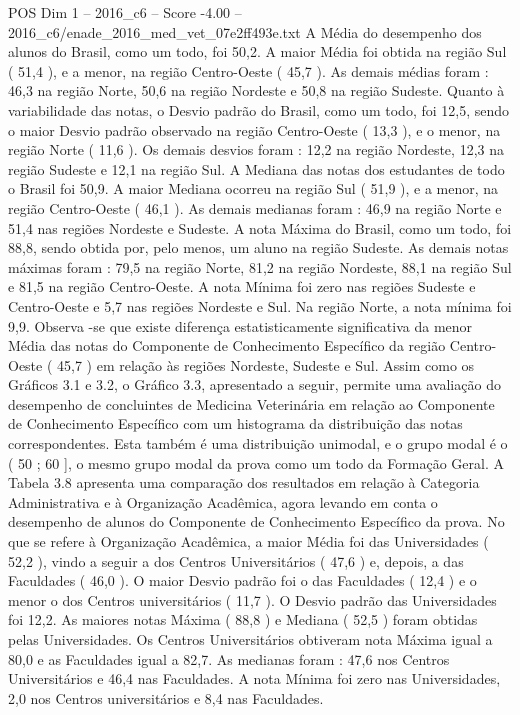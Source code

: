 \begin{textsample}{POS Dim 1 – 2016\_c6 – Score -4.00 – 2016\_c6/enade\_2016\_med\_vet\_07e2ff493e.txt}
A Média do desempenho dos alunos do Brasil, como um todo, foi 50,2.
A maior Média foi obtida na região Sul ( 51,4 ), e a menor, na região Centro-Oeste ( 45,7 ).
As demais médias foram : 46,3 na região Norte, 50,6 na região Nordeste e 50,8 na região Sudeste.
Quanto à variabilidade das notas, o Desvio padrão do Brasil, como um todo, foi 12,5, sendo o maior Desvio padrão observado na região Centro-Oeste ( 13,3 ), e o menor, na região Norte ( 11,6 ).
Os demais desvios foram : 12,2 na região Nordeste, 12,3 na região Sudeste e 12,1 na região Sul.
A Mediana das notas dos estudantes de todo o Brasil foi 50,9.
A maior Mediana ocorreu na região Sul ( 51,9 ), e a menor, na região Centro-Oeste ( 46,1 ).
As demais medianas foram : 46,9 na região Norte e 51,4 nas regiões Nordeste e Sudeste.
A nota Máxima do Brasil, como um todo, foi 88,8, sendo obtida por, pelo menos, um aluno na região Sudeste.
As demais notas máximas foram : 79,5 na região Norte, 81,2 na região Nordeste, 88,1 na região Sul e 81,5 na região Centro-Oeste.
A nota Mínima foi zero nas regiões Sudeste e Centro-Oeste e 5,7 nas regiões Nordeste e Sul.
Na região Norte, a nota mínima foi 9,9.
Observa -se que existe diferença estatisticamente significativa da menor Média das notas do Componente de Conhecimento Específico da região Centro-Oeste ( 45,7 ) em relação às regiões Nordeste, Sudeste e Sul.
Assim como os Gráficos 3.1 e 3.2, o Gráfico 3.3, apresentado a seguir, permite uma avaliação do desempenho de concluintes de Medicina Veterinária em relação ao Componente de Conhecimento Específico com um histograma da distribuição das notas correspondentes.
Esta também é uma distribuição unimodal, e o grupo modal é o ( 50 ; 60 ], o mesmo grupo modal da prova como um todo da Formação Geral.
A Tabela 3.8 apresenta uma comparação dos resultados em relação à Categoria Administrativa e à Organização Acadêmica, agora levando em conta o desempenho de alunos do Componente de Conhecimento Específico da prova.
No que se refere à Organização Acadêmica, a maior Média foi das Universidades ( 52,2 ), vindo a seguir a dos Centros Universitários ( 47,6 ) e, depois, a das Faculdades ( 46,0 ).
O maior Desvio padrão foi o das Faculdades ( 12,4 ) e o menor o dos Centros universitários ( 11,7 ).
O Desvio padrão das Universidades foi 12,2.
As maiores notas Máxima ( 88,8 ) e Mediana ( 52,5 ) foram obtidas pelas Universidades.
Os Centros Universitários obtiveram nota Máxima igual a 80,0 e as Faculdades igual a 82,7.
As medianas foram : 47,6 nos Centros Universitários e 46,4 nas Faculdades.
A nota Mínima foi zero nas Universidades, 2,0 nos Centros universitários e 8,4 nas Faculdades.

\end{textsample}
